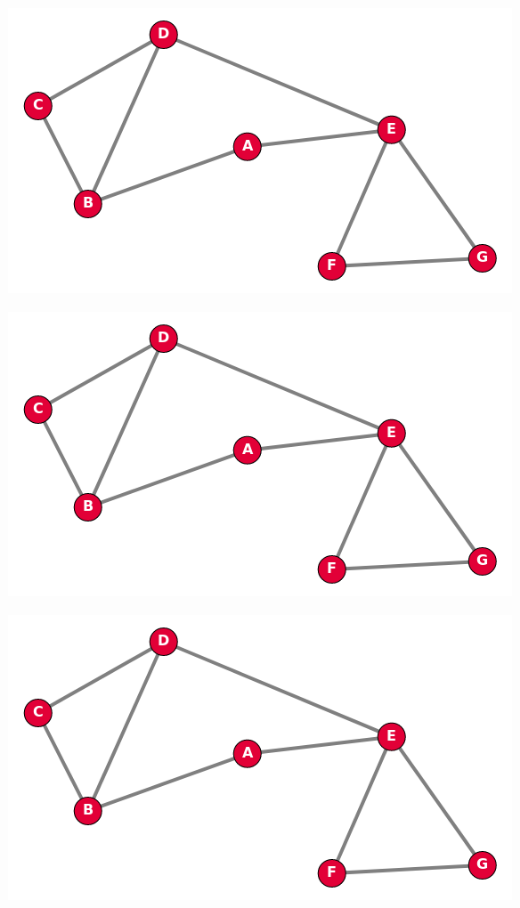 \documentclass[a4paper,11pt]{article}
\begin{document}
\setlength{\columnseprule}{1 pt}
\begin{multicols}{2}

\parskip=12pt
\includegraphics[width=\linewidth]{../images/exemple_graphe}

\includegraphics[width=\linewidth]{../images/exemple_graphe}

\includegraphics[width=\linewidth]{../images/exemple_graphe}


\end{multicols}
\end{document}

